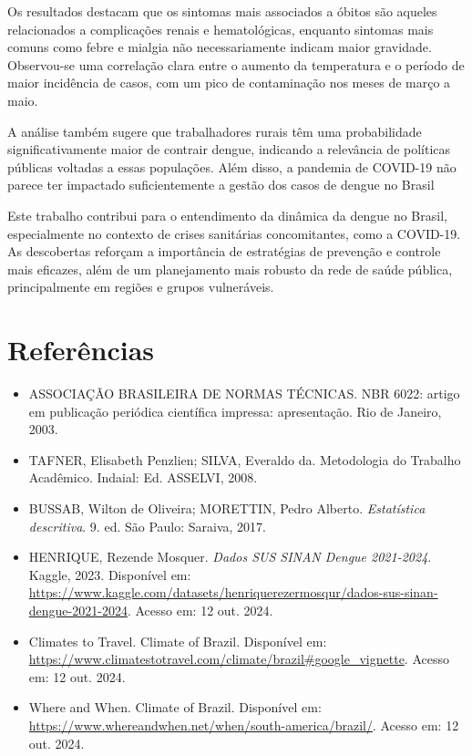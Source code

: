 \documentclass[a4paper,12pt]{article}
\begin{document}
Os resultados destacam que os sintomas mais associados a óbitos são aqueles relacionados a complicações renais e hematológicas, enquanto sintomas mais comuns como febre e mialgia não necessariamente indicam maior gravidade. Observou-se uma correlação clara entre o aumento da temperatura e o período de maior incidência de casos, com um pico de contaminação nos meses de março a maio.

A análise também sugere que trabalhadores rurais têm uma probabilidade significativamente maior de contrair dengue, indicando a relevância de políticas públicas voltadas a essas populações. Além disso, a pandemia de COVID-19 não parece ter impactado suficientemente a gestão dos casos de dengue no Brasil

Este trabalho contribui para o entendimento da dinâmica da dengue no Brasil, especialmente no contexto de crises sanitárias concomitantes, como a COVID-19. As descobertas reforçam a importância de estratégias de prevenção e controle mais eficazes, além de um planejamento mais robusto da rede de saúde pública, principalmente em regiões e grupos vulneráveis.

\clearpage

\section{Referências}
\begin{itemize}
    \item ASSOCIAÇÃO BRASILEIRA DE NORMAS TÉCNICAS. NBR 6022: artigo em publicação periódica científica impressa: apresentação. Rio de Janeiro, 2003.
    \item TAFNER, Elisabeth Penzlien; SILVA, Everaldo da. Metodologia do Trabalho Acadêmico. Indaial: Ed. ASSELVI, 2008.
    \item BUSSAB, Wilton de Oliveira; MORETTIN, Pedro Alberto. \textit{Estatística descritiva}. 9. ed. São Paulo: Saraiva, 2017.
    \item HENRIQUE, Rezende Mosquer. \textit{Dados SUS SINAN Dengue 2021-2024}. Kaggle, 2023. Disponível em: \url{https://www.kaggle.com/datasets/henriquerezermosqur/dados-sus-sinan-dengue-2021-2024}. Acesso em: 12 out. 2024.
    \item Climates to Travel. Climate of Brazil. Disponível em: \url{https://www.climatestotravel.com/climate/brazil#google_vignette}. Acesso em: 12 out. 2024.
    \item Where and When. Climate of Brazil. Disponível em: \url{https://www.whereandwhen.net/when/south-america/brazil/}. Acesso em: 12 out. 2024.
\end{itemize}
\end{document}
